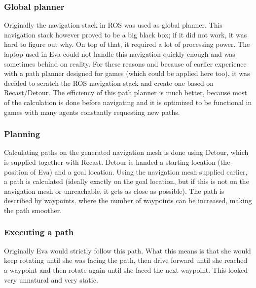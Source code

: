 \documentclass[project_eva.tex]{subfiles}
\begin{document}
\subsubsection*{Global planner}
Originally the navigation stack in ROS was used as global planner. This navigation stack however proved to be a big black 
box; if it did not work, it was hard to figure out why. On top of that, it required a lot of processing power. The laptop 
used in Eva could not handle this navigation quickly enough and was sometimes behind on reality. For these reasons and 
because of earlier experience with a path planner designed for games (which could be applied here too), it was decided to 
scratch the ROS navigation stack and create one based on Recast/Detour. The efficiency of this path planner is much better, 
because most of the calculation is done before navigating and it is optimized to be functional in games with many agents constantly requesting new paths.

\subsubsection*{Planning}
Calculating paths on the generated navigation mesh is done using Detour, which is supplied together with Recast. Detour is 
handed a starting location (the position of Eva) and a goal location. Using the navigation mesh supplied earlier, a path is 
calculated (ideally exactly on the goal location, but if this is not on the navigation mesh or unreachable, it gets as 
close as possible). The path is described by waypoints, where the number of waypoints can be increased, making the path 
smoother.

\subsubsection*{Executing a path}
Originally Eva would strictly follow this path. What this means is that she would keep rotating until she was facing the 
path, then drive forward until she reached a waypoint and then rotate again until she faced the next waypoint. This looked 
very unnatural and very static. 
\end{document}
